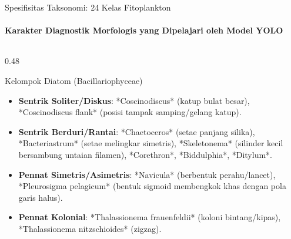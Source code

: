 \documentclass[aspectratio=169, 10pt]{beamer}
\begin{document}
\begin{frame}{Spesifisitas Taksonomi: 24 Kelas Fitoplankton}
    \framesubtitle{Karakter Diagnostik Morfologis yang Dipelajari oleh Model YOLO}
    
    \begin{columns}[T]
        \begin{column}{0.48\textwidth}
            \begin{biocard}{Kelompok Diatom (Bacillariophyceae)}
                \scriptsize
                \begin{itemize}\setlength\itemsep{2pt}
                    \item \textbf{Sentrik Soliter/Diskus}: *Coscinodiscus* (katup bulat besar), *Coscinodiscus flank* (posisi tampak samping/gelang katup).
                    \item \textbf{Sentrik Berduri/Rantai}: *Chaetoceros* (setae panjang silika), *Bacteriastrum* (setae melingkar simetris), *Skeletonema* (silinder kecil bersambung untaian filamen), *Corethron*, *Biddulphia*, *Ditylum*.
                    \item \textbf{Pennat Simetris/Asimetris}: *Navicula* (berbentuk perahu/lancet), *Pleurosigma pelagicum* (bentuk sigmoid membengkok khas dengan pola garis halus).
                    \item \textbf{Pennat Kolonial}: *Thalassionema frauenfeldii* (koloni bintang/kipas), *Thalassionema nitzschioides* (zigzag).
                \end{itemize}
            \end{biocard}
        \end{column}
        

\end{columns}
\end{frame}
\end{document}
